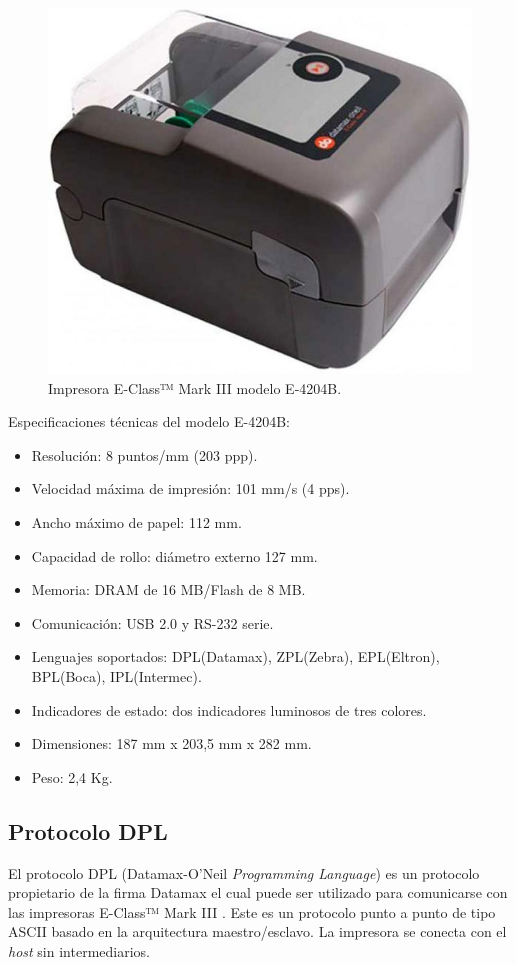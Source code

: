\begin{figure}[htpb]
	\centering
	\includegraphics[scale=0.3]{./Figures/printer.jpeg}
	\caption{Impresora E-Class™ Mark III modelo E-4204B.}
	\label{fig:printer}
\end{figure}


Especificaciones técnicas del modelo E-4204B:
\begin{itemize}
\item Resolución: 8 puntos/mm (203 ppp).
\item Velocidad máxima de impresión: 101 mm/s (4 pps).
\item Ancho máximo de papel: 112 mm.
\item Capacidad de rollo: diámetro externo 127 mm.
\item Memoria: DRAM de 16 MB/Flash de 8 MB.
\item Comunicación: USB 2.0 y RS-232 serie.
\item Lenguajes soportados: DPL(Datamax), ZPL(Zebra), EPL(Eltron), BPL(Boca), IPL(Intermec).
\item Indicadores de estado: dos indicadores luminosos de tres colores.
\item Dimensiones: 187 mm x 203,5 mm x 282 mm.
\item Peso: 2,4 Kg.
\end{itemize}

\subsection{Protocolo DPL}
\label{subsec:ProDPL}
El protocolo DPL (Datamax-O’Neil \textit{Programming Language}) es un protocolo propietario de la firma Datamax el cual puede ser utilizado para comunicarse con las impresoras E-Class™ Mark III \citep{DPL_man}. Este es un protocolo punto a punto de tipo ASCII basado en la arquitectura maestro/esclavo. La impresora se conecta con el \textit{host} sin intermediarios.

